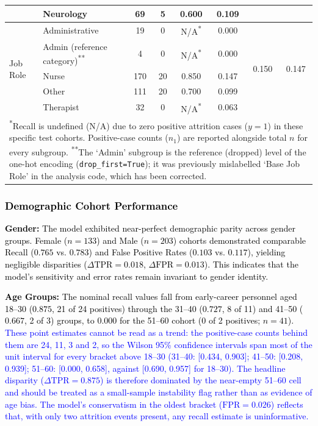\documentclass[a4paper,fleqn]{cas-sc}
\begin{document}
\begin{table}[pos=H]
\begin{tabular}{l l c c c c c c}
& Neurology & 69 & 5 & 0.600 & 0.109 & & \\
\midrule
\multirow{5}{*}{Job Role} 
& Administrative & 19 & 0 & N/A\textsuperscript{*} & 0.000 & \multirow{5}{*}{0.150} & \multirow{5}{*}{0.147} \\
& Admin (reference category)\textsuperscript{**} & 4 & 0 & N/A\textsuperscript{*} & 0.000 & & \\
& Nurse & 170 & 20 & 0.850 & 0.147 & & \\
& Other & 111 & 20 & 0.700 & 0.099 & & \\
& Therapist & 32 & 0 & N/A\textsuperscript{*} & 0.063 & & \\
\bottomrule
\multicolumn{8}{l}{\footnotesize \textsuperscript{*}Recall is undefined (N/A) due to zero positive attrition cases ($y=1$) in these specific test cohorts. Positive-case counts ($n_1$) are reported alongside total $n$ for every subgroup. \textsuperscript{**}The `Admin' subgroup is the reference (dropped) level of the one-hot encoding (\texttt{drop\_first=True}); it was previously mislabelled `Base Job Role' in the analysis code, which has been corrected.}
\end{tabular}
\end{table}

\subsubsection*{\textcolor{black}{Demographic Cohort Performance}}
\textcolor{black}{\textbf{Gender:} The model exhibited near-perfect demographic parity across gender groups. Female ($n = 133$) and Male ($n = 203$) cohorts demonstrated comparable Recall ($0.765$ vs. $0.783$) and False Positive Rates ($0.103$ vs. $0.117$), yielding negligible disparities ($\Delta\text{TPR} = 0.018$, $\Delta\text{FPR} = 0.013$). This indicates that the model's sensitivity and error rates remain invariant to gender identity.}

\textcolor{black}{\textbf{Age Groups:} The nominal recall values fall from early-career personnel aged 18–30 ($0.875$, 21 of 24 positives) through the 31–40 ($0.727$, 8 of 11) and 41–50 ($0.667$, 2 of 3) groups, to $0.000$ for the 51–60 cohort (0 of 2 positives; $n = 41$). \textcolor{blue}{These point estimates cannot be read as a trend: the positive-case counts behind them are 24, 11, 3 and 2, so the Wilson 95\% confidence intervals span most of the unit interval for every bracket above 18–30 (31–40: [0.434, 0.903]; 41–50: [0.208, 0.939]; 51–60: [0.000, 0.658], against [0.690, 0.957] for 18–30). The headline disparity ($\Delta\text{TPR} = 0.875$) is therefore dominated by the near-empty 51–60 cell and should be treated as a small-sample instability flag rather than as evidence of age bias. The model's conservatism in the oldest bracket ($\text{FPR} = 0.026$) reflects that, with only two attrition events present, any recall estimate is uninformative.}}
\end{document}
